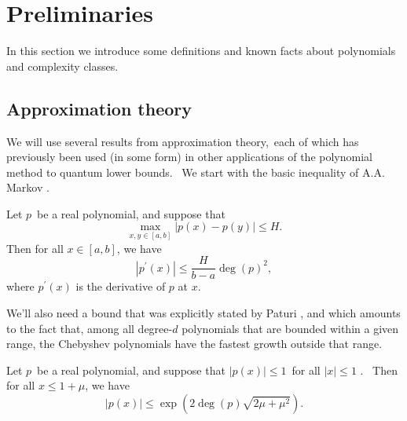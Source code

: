 \setcounter{section}{1}
\setcounter{theorem}{5}
\setcounter{equation}{4}
\setcounter{figure}{2}
\section{Preliminaries}

\label{sec:prelim}

In this section we introduce some definitions and known facts about
polynomials and complexity classes.

%
\subsection{Approximation theory}
\label{s:approxprelim}
We will use several results from approximation theory,\ each of which has
previously been used (in some form) in other applications of the polynomial
method to quantum lower bounds. \ We start with the basic inequality of A.A.
Markov \cite{markov1890question}.

\begin{lemma}[Markov]
\label{markovlem}Let $p$\ be a real polynomial, and suppose that
\begin{equation}
\max_{x,y\in\left[ a,b\right] }\left\vert p\left( x\right) -p\left( y\right)
\right\vert \leq H.
\end{equation}
Then for all $x\in\left[ a,b\right] $, we have
\begin{equation}
\left\vert p^{\prime}\left( x\right) \right\vert \leq\frac{H}{b-a}\deg\left(
p\right) ^{2},
\end{equation}
where $p^{\prime}(x)$ is the derivative of $p$ at $x$.
\end{lemma}

We'll also need a bound that was explicitly stated by Paturi \cite{paturi},
and which amounts to the fact that, among all degree-$d$
polynomials that are bounded within a given range, the Chebyshev polynomials
have the fastest growth outside that range.

\begin{lemma}[Paturi]
\label{paturilem}Let $p$\ be a real polynomial, and suppose that $\left\vert
p\left( x\right) \right\vert \leq1$\ for all $\left\vert x\right\vert \leq1$
. \ Then for all $x\leq1+\mu$, we have
\begin{equation}
\left\vert p\left( x\right) \right\vert \leq\exp\left( 2\deg\left( p\right)
\sqrt{2\mu+\mu^{2}}\right) .
\end{equation}
\end{lemma}

